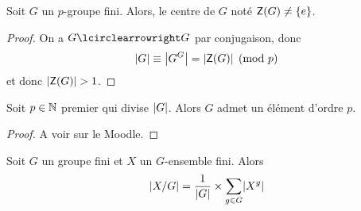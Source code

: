 \begin{corollary}
    Soit \(G\) un \(p\)-groupe fini. Alors, le centre de \(G\)
    noté \(\mathsf{Z} (G) \neq \{e\}\).
\end{corollary}

\begin{proof}
    On a \(G\act G\) par conjugaison, donc
    \begin{equation*}
        \mathopen{}\left|G\right|\mathclose{} \equiv \mathopen{}\left|G^G\right|\mathclose{} = \mathopen{}\left|\mathsf{Z} (G)\right|\mathclose{} \pmod p
    \end{equation*}
    et donc \(\mathopen{}\left|\mathsf{Z} (G)\right|\mathclose{} > 1\).
\end{proof}

\begin{theorem}[de Cauchy]
    Soit \(p\in\mathbb{N}\) premier qui divise \(\mathopen{}\left|G\right|\mathclose{}\). Alors
    \(G\) admet un élément d'ordre \(p\).
\end{theorem}

\begin{proof}
    A voir sur le Moodle.
\end{proof}

\begin{lemma}[de Burnside]
    Soit \(G\) un groupe fini et \(X\) un \(G\)-ensemble fini.
    Alors
    \begin{equation*}
        \mathopen{}\left|X/G\right|\mathclose{} = \frac{1}{\mathopen{}\left|G\right|\mathclose{}}\times \sum_{g\in G}\mathopen{}\left|X^g\right|\mathclose{}
    \end{equation*}
\end{lemma}













